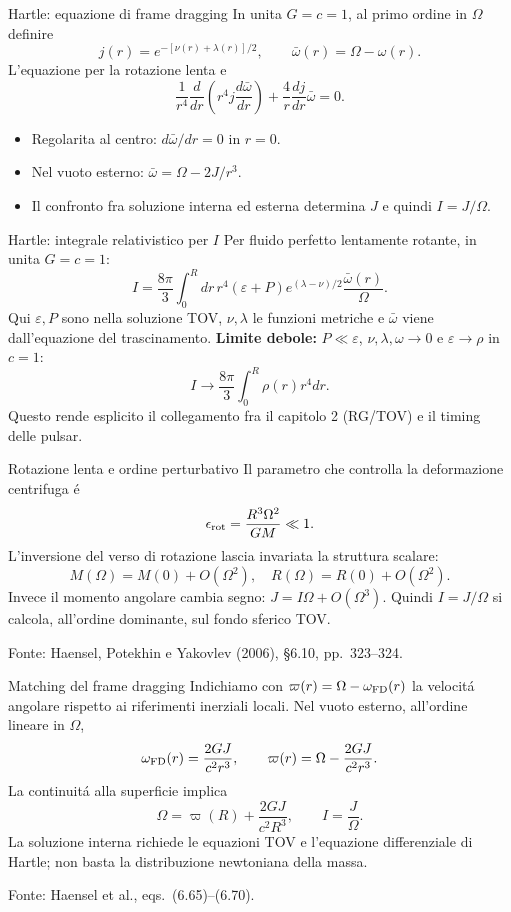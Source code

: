 \begin{frame}[t]{Hartle: equazione di frame dragging}
\small
In unita $G=c=1$, al primo ordine in $\Omega$ definire
\[
j(r)=e^{-[\nu(r)+\lambda(r)]/2},\qquad
\bar\omega(r)=\Omega-\omega(r).
\]
L'equazione per la rotazione lenta e
\[
\frac1{r^4}\frac{d}{dr}
\left(r^4 j\frac{d\bar\omega}{dr}\right)
+\frac4r\frac{dj}{dr}\bar\omega=0.
\]
\begin{itemize}
\item Regolarita al centro: $d\bar\omega/dr=0$ in $r=0$.
\item Nel vuoto esterno: $\bar\omega=\Omega-2J/r^3$.
\item Il confronto fra soluzione interna ed esterna determina $J$ e quindi $I=J/\Omega$.
\end{itemize}
\end{frame}

\begin{frame}[t]{Hartle: integrale relativistico per $I$}
\small
Per fluido perfetto lentamente rotante, in unita $G=c=1$:
\[
I=\frac{8\pi}{3}\int_0^Rdr\,r^4(\varepsilon+P)
 e^{(\lambda-\nu)/2}\frac{\bar\omega(r)}{\Omega}.
\]
Qui $\varepsilon,P$ sono nella soluzione TOV, $\nu,\lambda$ le funzioni metriche e $\bar\omega$ viene dall'equazione del trascinamento.
\medskip
\textbf{Limite debole:} $P\ll\varepsilon$, $\nu,\lambda,\omega\to0$ e $\varepsilon\to\rho$ in $c=1$:
\[
I\longrightarrow\frac{8\pi}{3}\int_0^R\rho(r)r^4dr.
\]
Questo rende esplicito il collegamento fra il capitolo 2 (RG/TOV) e il timing delle pulsar.
\end{frame}


\begin{frame}[t]{Rotazione lenta e ordine perturbativo}
\small
Il parametro che controlla la deformazione centrifuga \'e
\[
\epsilon_{\rm rot}=\frac{R^3\Omega^2}{GM}\ll1.
\]
L'inversione del verso di rotazione lascia invariata la struttura scalare:
\[
M(\Omega)=M(0)+O(\Omega^2),\quad R(\Omega)=R(0)+O(\Omega^2).
\]
Invece il momento angolare cambia segno: $J=I\Omega+O(\Omega^3)$.
Quindi $I=J/\Omega$ si calcola, all'ordine dominante, sul fondo sferico TOV.
\par\medskip
\footnotesize Fonte: Haensel, Potekhin e Yakovlev (2006), \S6.10, pp.~323--324.
\end{frame}

\begin{frame}[t]{Matching del frame dragging}
\small
Indichiamo con $\varpi(r)=\Omega-\omega_{\rm FD}(r)$ la velocit\'a angolare rispetto ai riferimenti inerziali locali.
Nel vuoto esterno, all'ordine lineare in $\Omega$,
\[
\omega_{\rm FD}(r)=\frac{2GJ}{c^2r^3},\qquad
\varpi(r)=\Omega-\frac{2GJ}{c^2r^3}.
\]
La continuit\'a alla superficie implica
\[
\Omega=\varpi(R)+\frac{2GJ}{c^2R^3},\qquad I=\frac{J}{\Omega}.
\]
La soluzione interna richiede le equazioni TOV e l'equazione differenziale di Hartle; non basta la distribuzione newtoniana della massa.
\par\medskip
\footnotesize Fonte: Haensel et al., eqs.~(6.65)--(6.70).
\end{frame}

